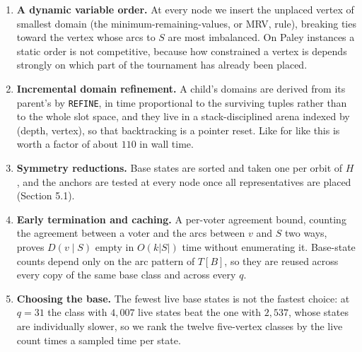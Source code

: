 \documentclass[
]{article}
\providecommand{\tightlist}{%
  \setlength{\itemsep}{0pt}\setlength{\parskip}{0pt}}
\begin{document}
\begin{enumerate}
\def\labelenumi{\arabic{enumi}.}
\tightlist
\item
  \textbf{A dynamic variable order.} At every node we insert the
  unplaced vertex of smallest domain (the minimum-remaining-values, or
  MRV, rule), breaking ties toward the vertex whose arcs to \(S\) are
  most imbalanced. On Paley instances a static order is not competitive,
  because how constrained a vertex is depends strongly on which part of
  the tournament has already been placed.
\item
  \textbf{Incremental domain refinement.} A child's domains are derived
  from its parent's by \texttt{REFINE}, in time proportional to the
  surviving tuples rather than to the whole slot space, and they live in
  a stack-disciplined arena indexed by (depth, vertex), so that
  backtracking is a pointer reset. Like for like this is worth a factor
  of about \(110\) in wall time.
\item
  \textbf{Symmetry reductions.} Base states are sorted and taken one per
  orbit of \(H\), and the anchors are tested at every node once all
  representatives are placed (Section 5.1).
\item
  \textbf{Early termination and caching.} A per-voter agreement bound,
  counting the agreement between a voter and the arcs between \(v\) and
  \(S\) two ways, proves \(D(v \mid S)\) empty in \(O(k|S|)\) time
  without enumerating it. Base-state counts depend only on the arc
  pattern of \(T[B]\), so they are reused across every copy of the same
  base class and across every \(q\).
\item
  \textbf{Choosing the base.} The fewest live base states is not the
  fastest choice: at \(q = 31\) the class with \(4{,}007\) live states
  beat the one with \(2{,}537\), whose states are individually slower,
  so we rank the twelve five-vertex classes by the live count times a
  sampled time per state.
\end{enumerate}
\end{document}
